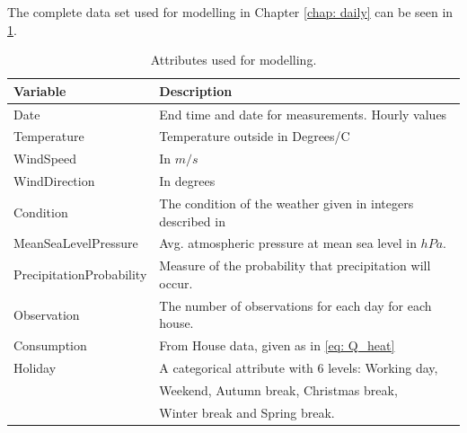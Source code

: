 \noindent The complete data set used for modelling in Chapter \ref{chap: daily} can be seen in \cref{tab: modeldata}.
\begin{table}[H]
    \centering
    \begin{tabular}{ll}
     \hline
     \textbf{Variable} & \textbf{Description} \\
    \hline
    \hline
    Date  &  End time and date for measurements. Hourly values\\
    Temperature  &  Temperature outside in Degrees/C \\
    WindSpeed  &  In $m/s$\\ 
    WindDirection  &  In degrees\\
    Condition  & The condition of the weather given in integers described in \cite{condition}\\
    MeanSeaLevelPressure & Avg. atmospheric pressure at mean sea level in $hPa$.\\
    PrecipitationProbability & Measure of the probability that precipitation will occur. \\
    Observation & The number of observations for each day for each house.\\
    Consumption & From House data, given as in \cref{eq: Q_heat} \\
    Holiday & A categorical attribute with 6 levels: Working day, \\ & Weekend, Autumn break, Christmas break, \\ & Winter break and Spring break.\\
    \hline
    \end{tabular}
    \caption{Attributes used for modelling.}
    \label{tab: modeldata}
\end{table}   

